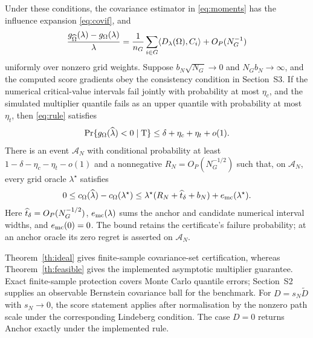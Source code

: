 \begin{theorem}\label{th:feasible}
Under these conditions, the covariance estimator in \eqref{eq:moments} has the influence expansion \eqref{eq:covif}, and
\begin{equation}\label{eq:slopelinear}
 \frac{g_{\widehat\Omega}(\lambda)-g_\Omega(\lambda)}{\lambda}
   =\frac1{n_G}\sum_{i\in G}\langle D_\lambda(\Omega),C_i\rangle
     +O_P(N_G^{-1})
\end{equation}
uniformly over nonzero grid weights. Suppose $b_N\sqrt{N_G}\to0$ and $N_Gb_N\to\infty$, and the computed score gradients obey the consistency condition in Section~S3. If the numerical critical-value intervals fail jointly with probability at most $\eta_c$, and the simulated multiplier quantile fails as an upper quantile with probability at most $\eta_t$, then \eqref{eq:rule} satisfies
\begin{equation}\label{eq:asympsafety}
 \Pr\{g_\Omega(\widehat\lambda)<0\mid\mathrm{T}\}
       \leq\delta+\eta_c+\eta_t+o(1).
\end{equation}
There is an event $\mathcal A_N$ with conditional probability at least
$1-\delta-\eta_c-\eta_t-o(1)$ and a nonnegative $R_N=O_P(N_G^{-1/2})$ such that, on $\mathcal A_N$, every grid oracle $\lambda^\star$ satisfies
\begin{equation}\label{eq:feasible-regret}
 0\leq c_\Omega(\widehat\lambda)-c_\Omega(\lambda^\star)
 \leq\lambda^\star(R_N+\widehat t_\delta+b_N)+e_{\mathrm{mc}}(\lambda^\star).
\end{equation}
Here $\widehat t_\delta=O_P(N_G^{-1/2})$, $e_{\mathrm{mc}}(\lambda)$ sums the anchor and candidate numerical interval widths, and $e_{\mathrm{mc}}(0)=0$. The bound retains the certificate's failure probability; at an anchor oracle its zero regret is asserted on $\mathcal A_N$.
\end{theorem}
Theorem~\ref{th:ideal} gives finite-sample covariance-set certification, whereas Theorem~\ref{th:feasible} gives the implemented asymptotic multiplier guarantee.
Exact finite-sample protection covers Monte Carlo quantile errors; Section~S2 supplies an observable Bernstein covariance ball for the benchmark.
For $D=s_N\widetilde D$ with $s_N\to0$, the score statement applies after normalisation by the nonzero path scale under the corresponding Lindeberg condition.
The case $D=0$ returns Anchor exactly under the implemented rule.


